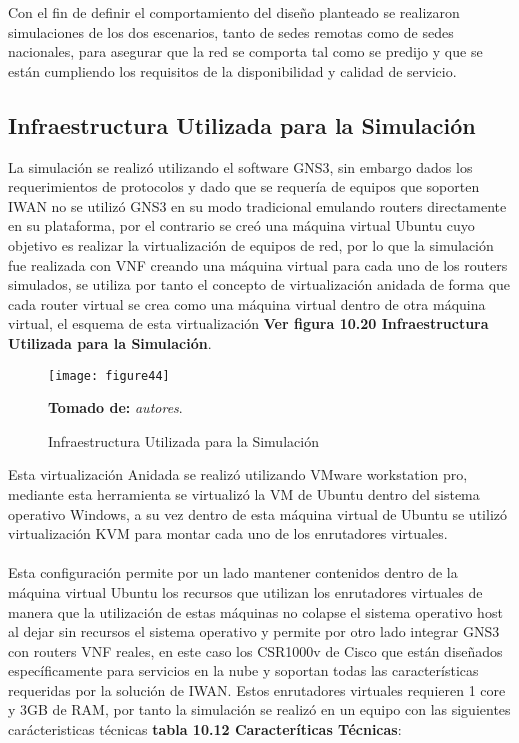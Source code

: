 Con el fin de definir el comportamiento del diseño planteado se realizaron simulaciones de los dos escenarios, tanto de sedes remotas como de sedes nacionales, para asegurar que la red se comporta tal como se predijo y que se están cumpliendo los requisitos de la disponibilidad y calidad de servicio.

\subsection{Infraestructura Utilizada para la Simulación} %
\label{sec:Infraestructura Utilizada para la Simulación}

La simulación se realizó utilizando el software GNS3, sin embargo dados los requerimientos de protocolos y dado que se requería de equipos que soporten IWAN no se utilizó GNS3 en su modo tradicional emulando routers directamente en su plataforma, por el contrario se creó una máquina virtual Ubuntu cuyo objetivo es realizar la virtualización de equipos de red, por lo que la simulación fue realizada con VNF creando una máquina virtual para cada uno de los routers simulados, se utiliza por tanto el concepto de virtualización anidada de forma que cada router virtual se crea como una máquina virtual dentro de otra máquina virtual, el esquema de esta virtualización \textbf{Ver figura 10.20 Infraestructura Utilizada para la Simulación}.
\begin{figure}[htbp]
  \centering
    {\texttt{[image: figure44]}}%
  \caption{Infraestructura Utilizada para la Simulación}
  \textbf{Tomado de:} \textit{autores}.
  \label{fig:fig2subfig}
\end{figure}
Esta virtualización Anidada se realizó utilizando VMware workstation pro, mediante esta herramienta se virtualizó la VM de Ubuntu dentro del sistema operativo Windows, a su vez dentro de esta máquina virtual de Ubuntu se utilizó virtualización KVM para montar cada uno de los enrutadores virtuales.
\\
\\
Esta configuración permite por un lado mantener contenidos dentro de la máquina virtual Ubuntu los recursos que utilizan los enrutadores virtuales de manera que la utilización de estas máquinas no colapse el sistema operativo host al dejar sin recursos el sistema operativo y permite por otro lado integrar GNS3 con routers VNF reales, en este caso los CSR1000v de Cisco que están diseñados específicamente para servicios en la nube y soportan todas las características requeridas por la solución de IWAN. Estos enrutadores virtuales requieren 1 core y 3GB de RAM, por tanto la simulación se realizó en un equipo con las siguientes carácteristicas técnicas \textbf{tabla 10.12 Caracteríticas Técnicas}:

